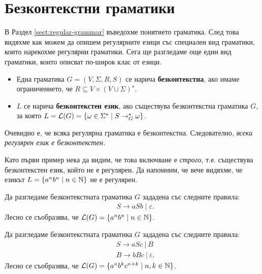 \section{Безконтекстни граматики}
В Раздел \ref{sect:regular-grammar} въведохме понятието граматика. След това видяхме как можем да опишем регулярните езици
със специален вид граматики, които нарекохме регулярни граматики.
Сега ще разгледаме още един вид граматики, които описват по-широк клас от езици.

\begin{itemize}
\item 
  Една граматика $G = (V, \Sigma, R, S)$ се нарича {\bf безконтекстна}, ако 
  имаме ограничението, че $R \subseteq V\times (V\cup\Sigma)^\star$.
\item
  $L$ се нарича {\bf безконтекстен език}, ако съществува безконтекстна граматика $G$, за която 
  $L = \mathcal{L}(G) = \{\omega \in \Sigma^\star \mid S \to^\star_G \omega\}$.
\end{itemize}

\begin{remark}
  Очевидно е, че всяка регулярна граматика е безконтекстна. Следователно, 
  {\em всеки регулярен език е безконтекстен.}
\end{remark}

Като първи пример нека да видим, че това включване е {\em строго}, т.е. съществува безконтекстен език, който не е регулярен.
Да напомним, че вече видяхме, че езикът $L = \{a^nb^n \mid n\in\mathbb{N}\}$ не е регулярен.

\begin{example}
  Да разгледаме безконтекстната граматика $G$ зададена със следните правила:
  \begin{align*}
    & S \to aSb \mid \varepsilon.
  \end{align*}
  Лесно се съобразява, че $\mathcal{L}(G) = \{a^nb^n \mid n\in\mathbb{N}\}$.
\end{example}

\begin{example}
  Да разгледаме безконтекстната граматика $G$ зададена със следните правила:
  \begin{align*}
    & S \to aSc\ |\  B\\
    & B \to bBc\ |\ \varepsilon.
  \end{align*}
  Лесно се съобразява, че $\mathcal{L}(G) = \{a^nb^kc^{n+k} \mid n,k\in\mathbb{N}\}$.
\end{example}

